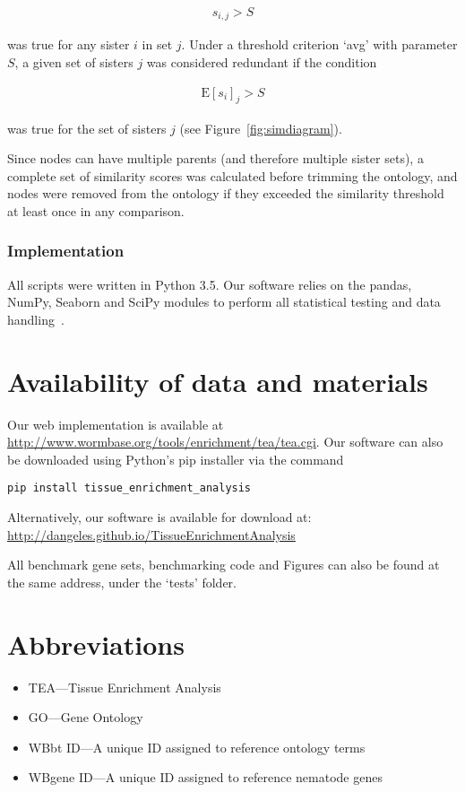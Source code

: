 \begin{eqnarray}
  \label{anythreshold}
	s_{i, j} > S
\end{eqnarray}

was true for any sister $i$ in set $j$. Under a threshold criterion `avg' with
parameter $S$, a given set of sisters $j$ was considered redundant if the
condition

\begin{eqnarray}
  \label{avgthreshold}
	\mathrm{E}[s_i]_{j} > S
\end{eqnarray}

was true for the set of sisters $j$ (see Figure~\ref{fig:simdiagram}).

Since nodes can have multiple parents (and therefore multiple sister sets), a
complete set of similarity scores was calculated before trimming the ontology,
and nodes were removed from the ontology if they exceeded the similarity
threshold at least once in any comparison.

\subsubsection*{Implementation}
All scripts were written in Python 3.5. Our software relies on the pandas, NumPy,
Seaborn and SciPy modules to perform all statistical testing and data
handling~\citep{McKinney2011, VanDerWalt2011, Oliphant2007}.


\section*{Availability of data and materials}
Our web implementation is available at
\url{http://www.wormbase.org/tools/enrichment/tea/tea.cgi}. Our software can also
be downloaded using Python's pip installer via the command

\texttt{pip install tissue\_enrichment\_analysis}

Alternatively, our software is available for download at:
\url{http://dangeles.github.io/TissueEnrichmentAnalysis}

All benchmark gene sets, benchmarking code and Figures can also be found at the
same address, under the `tests' folder.

\section*{Abbreviations}

\begin{itemize}
	\item TEA---Tissue Enrichment Analysis
	\item GO---Gene Ontology
	\item WBbt ID---A unique ID assigned to reference ontology terms
	\item WBgene ID---A unique ID assigned to reference nematode genes
\end{itemize}


